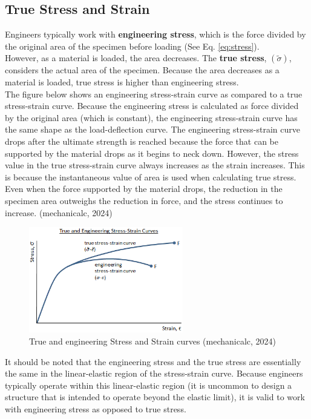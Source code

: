 \documentclass{article}
\begin{document}
    \subsection{True Stress and Strain}
    Engineers typically work with \textbf{engineering stress}, which is the force divided by the original area of the specimen before loading (See Eq. \ref{eq:stress}).\\[8pt] However, as a material is loaded, the area decreases. The \textbf{true stress}, $(\tilde{\sigma})$, considers the actual area of the specimen. Because the area decreases as a material is loaded, true stress is higher than engineering stress.\\[8pt]
    The figure below shows an engineering stress-strain curve as compared to a true stress-strain curve. Because the engineering stress is calculated as force divided by the original area (which is constant), the engineering stress-strain curve has the same shape as the load-deflection curve. The engineering stress-strain curve drops after the ultimate strength is reached because the force that can be supported by the material drops as it begins to neck down. However, the stress value in the true stress-strain curve always increases as the strain increases. This is because the instantaneous value of area is used when calculating true stress. Even when the force supported by the material \newpage 
    drops, the reduction in the specimen area outweighs the reduction in force, and the stress continues to increase. (mechanicalc, 2024)    
    \begin{figure}[H]
        \centering
        \includegraphics[width=0.6\textwidth]{images/true-stress-strain-diagram-01.png}
        \caption{True and engineering Stress and Strain curves (mechanicalc, 2024)}
        \label{fig:tvn}
    \end{figure}
    It should be noted that the engineering stress and the true stress are essentially the same in the linear-elastic region of the stress-strain curve. Because engineers typically operate within this linear-elastic region (it is uncommon to design a structure that is intended to operate beyond the elastic limit), it is valid to work with engineering stress as opposed to true stress.\\[8pt]
\end{document}
